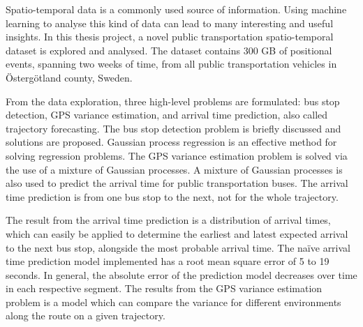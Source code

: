 Spatio-temporal data is a commonly used source of information. 
Using machine learning to analyse this kind of data can lead to many interesting and useful insights.
In this thesis project, a novel public transportation spatio-temporal dataset is explored and analysed.
The dataset contains 300 GB of positional events, spanning two weeks of time, from all public transportation vehicles in Östergötland county, Sweden.

From the data exploration, three high-level problems are formulated: bus stop detection, GPS variance estimation, and arrival time prediction, also called trajectory forecasting.
The bus stop detection problem is briefly discussed and solutions are proposed.
Gaussian process regression is an effective method for solving regression problems.
The GPS variance estimation problem is solved via the use of a mixture of Gaussian processes.
A mixture of Gaussian processes is also used to predict the arrival time for public transportation buses.
The arrival time prediction is from one bus stop to the next, not for the whole trajectory.

The result from the arrival time prediction is a distribution of arrival times, which can easily be applied to determine the earliest and latest expected arrival to the next bus stop, alongside the most probable arrival time.
The naïve arrival time prediction model implemented has a root mean square error of 5 to 19 seconds.
In general, the absolute error of the prediction model decreases over time in each respective segment.
The results from the GPS variance estimation problem is a model which can compare the variance for different environments along the route on a given trajectory.